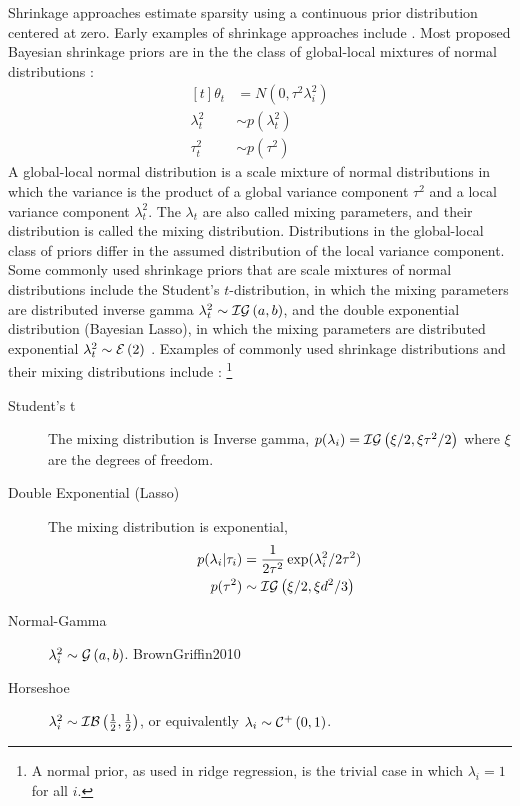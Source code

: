 \documentclass{article}
\begin{document}
Shrinkage approaches estimate sparsity using a continuous prior distribution centered at zero.
Early examples of shrinkage approaches include \parencites{Tibshirani1996}{Tipping2001}.
Most proposed Bayesian shrinkage priors are in the the class of global-local mixtures of normal distributions \parencite{PolsonScott2010}:
\begin{equation}
  \label{eq:3}
  \begin{aligned}[t]
    \theta_{t} &= N(0, \tau^{2} \lambda_{i}^{2}) \\ 
    \lambda_{t}^{2} &\sim p(\lambda_{t}^{2}) \\
    \tau_{t}^{2} &\sim p(\tau^{2})
  \end{aligned}
\end{equation}
A global-local normal distribution is a scale mixture of normal distributions in which the variance is the product of a global variance component $\tau^{2}$ and a local variance component $\lambda_{t}^{2}$.
The $\lambda_t$ are also called mixing parameters, and their distribution is called the mixing distribution.
Distributions in the global-local class of priors differ in the assumed distribution of the local variance component.%
Some commonly used shrinkage priors that are scale mixtures of normal distributions include the Student's $t$-distribution, in which the mixing parameters are distributed inverse gamma $\lambda^{2}_{t} \sim \mathcal{IG}\left(a, b\right)$, and the double exponential distribution (Bayesian Lasso), in which the mixing parameters are distributed exponential $\lambda^{2}_{t} \sim \mathcal{E}\left(2\right)$ \parencite[74]{CarvalhoPolsonScott2009}.
Examples of commonly used shrinkage distributions and their mixing distributions include \textcite{PolsonScott2010}:%
\footnote{A normal prior, as used in ridge regression, is the trivial case in which $\lambda_{i} = 1$ for all $i$.}
\begin{description}
\item[Student's t] The mixing distribution is Inverse gamma, $p(\lambda_{i}) = \mathcal{IG}\left(\xi / 2, \xi \tau^{2} / 2\right)$ where $\xi$ are the degrees of freedom. \parencite{Tipping2001}
\item[Double Exponential (Lasso)] The mixing distribution is exponential,
  \begin{equation*}
    \begin{aligned}[t]
      p(\lambda_{i} | \tau_{i}) &= \frac{1}{2 \tau^{2}} \exp (\lambda_{i}^{2} / 2 \tau^{2}) \\
      p(\tau^{2}) &\sim \mathcal{IG}\left(\xi / 2, \xi d^{2} / 3\right)
    \end{aligned}
  \end{equation*}
\item[Normal-Gamma] $\lambda^{2}_{i} \sim \mathcal{G}\left(a, b\right)$. \parencite{CaronDoucet2008}{BrownGriffin2010}
\item[Horseshoe] $\lambda^{2}_{i} \sim \mathcal{IB}\left(\frac{1}{2}, \frac{1}{2}\right)$, or equivalently $\lambda_{i} \sim \mathcal{C}^{+}\left(0, 1\right)$. \parencite{CarvalhoPolsonScott2010}
\end{description}
\end{document}
